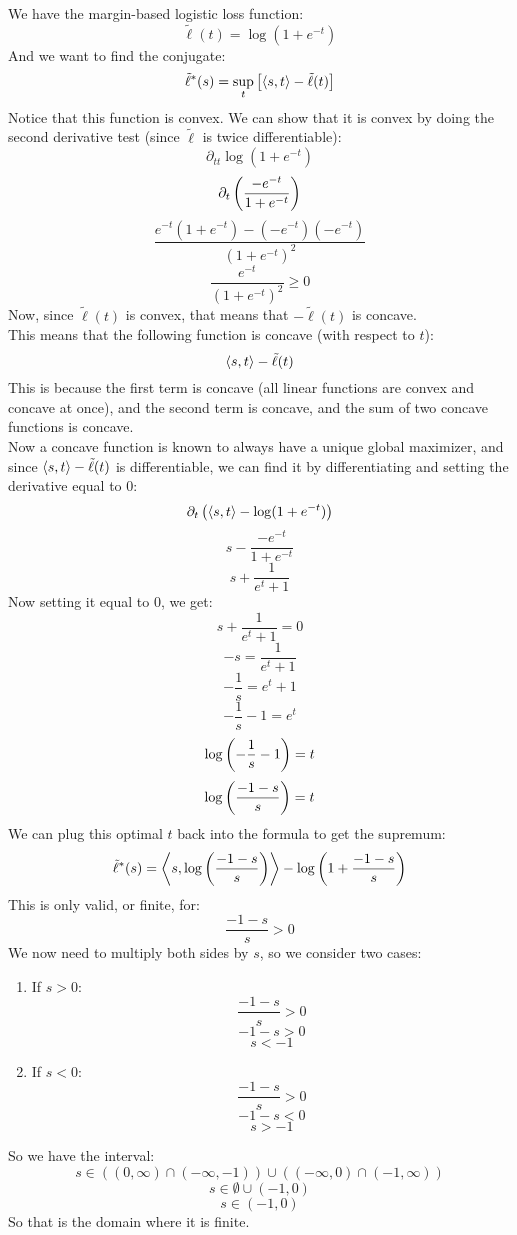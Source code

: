 \documentclass[12pt]{article}
\begin{document}
We have the margin-based logistic loss function:
\[ \tilde{\ell}(t) = \log(1 + e^{-t}) \]
And we want to find the conjugate:
\[ \tilde{\ell}^*(s) = \sup_{t}\left[ \left\langle s, t \right\rangle 
- \tilde{\ell}(t) \right] \]
Notice that this function is convex.
We can show that it is convex by doing the second
derivative test (since $\tilde{\ell}$
is twice differentiable):
\[\partial_{tt}\log(1 + e^{-t}) \]
\[\partial_{t} \left( \dfrac{-e^{-t}}{1 + e^{-t}} \right) \]
\[\dfrac{e^{-t}(1 + e^{-t}) - (-e^{-t})(-e^{-t})}
{(1 + e^{-t})^2}\]
\[\dfrac{e^{-t}}{(1 + e^{-t})^2} \geq 0 \]
Now, since $\tilde{\ell}(t)$
is convex, that means that $-\tilde{\ell}(t)$
is concave. \\
This means that the following function is concave
(with respect to $t$):
\[ \left\langle s, t \right\rangle - \tilde{\ell}(t) \]
This is because the first term is concave
(all linear functions are convex and concave
at once), and the second term is concave,
and the sum of two concave functions is concave. \\
Now a concave function is known to always have
a unique global maximizer, and since 
$\left\langle s, t \right\rangle - \tilde{\ell}(t)$ is differentiable,
we can find it by differentiating and setting
the derivative equal to $0$:
\[ \partial_t\left( \left\langle s, t \right\rangle - \log(1 + e^{-t}) \right) \]
\[ s - \dfrac{-e^{-t}}{1 + e^{-t}} \]
\[ s + \dfrac{1}{e^{t} + 1} \]
Now setting it equal to $0$, we get:
\[ s + \dfrac{1}{e^t + 1} = 0\]
\[ -s = \dfrac{1}{e^t + 1} \]
\[ -\dfrac{1}{s} = e^t + 1 \]
\[ -\dfrac{1}{s} - 1 = e^t \]
\[ \log\left( -\dfrac{1}{s} - 1 \right) = t \]
\[ \log\left( \dfrac{-1 - s}{s} \right) = t \]
We can plug this optimal $t$ back into
the formula to get the supremum:
\[ \tilde{\ell}^*(s)
= \left\langle s, \log\left( \dfrac{-1 - s}{s} \right) \right\rangle
- \log\left( 1+ \dfrac{-1 - s}{s} \right) \]
This is only valid, or finite, for:
\[ \dfrac{-1 - s}{s} > 0 \]
We now need to multiply both sides by $s$,
so we consider two cases:
\begin{enumerate}
    \item If $s > 0$:
        \[ \dfrac{-1 - s}{s} > 0 \]
        \[ -1 - s > 0 \]
        \[ s < -1 \]
    \item If $s < 0$:
        \[ \dfrac{-1 - s}{s} > 0 \]
        \[ -1-s < 0 \]
        \[ s > -1 \]
\end{enumerate}
So we have the interval:
\[ s \in ((0, \infty) \cap (-\infty, -1))
\cup ((-\infty, 0) \cap (-1, \infty)) \]
\[ s \in \emptyset
\cup (-1, 0) \]
\[ s \in (-1, 0) \]
So that is the domain where it is finite. \\


\end{document}
